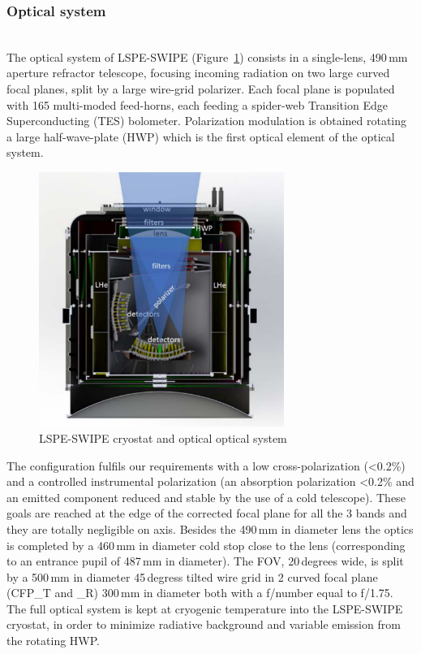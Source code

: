 \subsubsection{Optical system}
 \\
The optical system of LSPE-SWIPE (Figure~\ref{fig:swipe_optics}) consists in a single-lens, 
490\,mm aperture refractor telescope, focusing incoming radiation 
on two large curved focal planes, split by a large wire-grid polarizer. 
Each focal plane is populated with 165 multi-moded feed-horns, 
each feeding a spider-web Transition Edge Superconducting (TES) 
bolometer. Polarization modulation is obtained rotating a large 
half-wave-plate (HWP) which is the first optical element of the optical 
system.
   \begin{figure}[h!]
   \centering
   \includegraphics[width=8cm]{figs/swipe_optics_3d}
   \caption{LSPE-SWIPE cryostat and optical optical system
   }
              \label{fig:swipe_optics}%
    \end{figure}
    
The configuration fulfils our requirements with a low cross-polarization (<0.2\%) 
and a controlled instrumental polarization (an absorption polarization <0.2\% 
and an emitted component reduced and stable by the use of a cold telescope). 
These goals are reached at the edge of the corrected focal plane for all the 3 
bands and they are totally negligible on axis. 
Besides the 490\,mm in diameter lens the optics is completed by a 460\,mm in 
diameter cold stop close to the lens (corresponding to an entrance pupil of 
487\,mm in diameter). 
The FOV, 20\,degrees wide, is split by a 500\,mm in diameter 45\,degress tilted wire grid 
in 2 curved focal plane (CFP\_T and \_R) 300\,mm in diameter both with 
a f/number equal to f/1.75.
The full optical system is kept at cryogenic temperature into the LSPE-SWIPE cryostat, 
in order to minimize radiative background and variable emission from the 
rotating HWP. 

